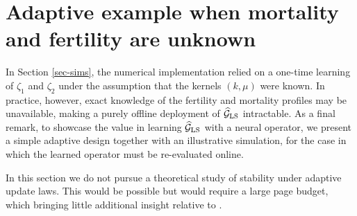 \documentclass[journal,twoside,web]{ieeecolor}
\begin{document}
\section{Adaptive example when mortality and fertility are unknown} \label{sec-adaptive}
In Section \ref{sec-sims}, the numerical implementation relied on a one-time learning of $\zeta_1$ and $\zeta_2$ under the assumption that the kernels $(k,\mu)$ were known. In practice, however, exact knowledge of the fertility and mortality profiles may be unavailable, making a purely offline deployment of $\widehat{\mathcal{G}}_{\rm LS}$ intractable. As a final remark, to showcase the value in learning $\widehat{\mathcal{G}}_{\rm LS}$ with a neural operator, we present a simple adaptive design together with an illustrative simulation, for the case in which the learned operator must be re-evaluated online.

In this section we do not pursue a theoretical study of stability under adaptive update laws. This would be possible but would require a large page budget, which bringing little additional insight relative to \cite{lamarque2025Adaptive}. 
\end{document}
